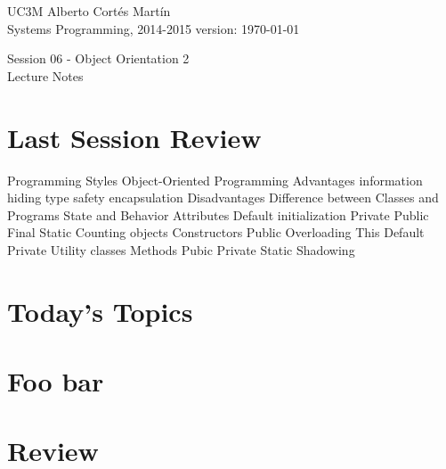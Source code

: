 \documentclass[a4paper, 9pt]{extarticle}
\newcommand{\realtitle}{Session 06 - Object Orientation 2}
\begin{document}
\makebox[\linewidth]{\rule{\textwidth}{0.4pt}}
UC3M \hfill Alberto Cortés Martín\\
Systems Programming, 2014-2015 \hfill version: \today\\
\makebox[\linewidth]{\rule{\textwidth}{0.4pt}}
\begin{center}
  \Large{\realtitle}\\Lecture Notes
\end{center}
\makebox[\linewidth]{\rule{\textwidth}{0.4pt}}
\vspace{1cm}

\section{Last Session Review}

\begin{blackboard}
Programming Styles
Object-Oriented Programming
  Advantages
    information hiding
    type safety
    encapsulation
  Disadvantages
Difference between Classes and Programs
State and Behavior
Attributes
  Default initialization
  Private
  Public
  Final
  Static
    Counting objects
Constructors
  Public
  Overloading
  This
  Default
  Private
    Utility classes
Methods
  Pubic
  Private
  Static
Shadowing
\end{blackboard}









\section{Today's Topics}
\begin{blackboard}

\end{blackboard}




\section{Foo bar}







\section{Review}

\begin{blackboard}

\end{blackboard}
\end{document}
